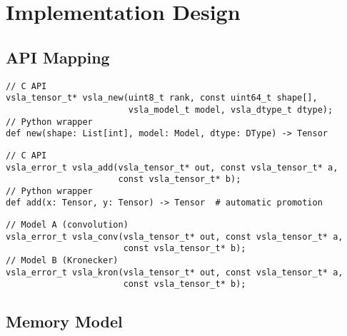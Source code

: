\section{Implementation Design}
\label{sec:implementation}

\subsection{API Mapping}
\label{sec:api}

\begin{tcolorbox}[colback=api,colframe=green!50!black,title=C Library API Mapping]
\begin{description}[leftmargin=2em]
\item[Tensor Creation:] 
\begin{verbatim}
// C API
vsla_tensor_t* vsla_new(uint8_t rank, const uint64_t shape[], 
                        vsla_model_t model, vsla_dtype_t dtype);
// Python wrapper  
def new(shape: List[int], model: Model, dtype: DType) -> Tensor
\end{verbatim}

\item[Variable-Shape Operations:]
\begin{verbatim}
// C API  
vsla_error_t vsla_add(vsla_tensor_t* out, const vsla_tensor_t* a, 
                      const vsla_tensor_t* b);
// Python wrapper
def add(x: Tensor, y: Tensor) -> Tensor  # automatic promotion
\end{verbatim}

\item[Semiring Products:]
\begin{verbatim}
// Model A (convolution)
vsla_error_t vsla_conv(vsla_tensor_t* out, const vsla_tensor_t* a, 
                       const vsla_tensor_t* b);
// Model B (Kronecker)  
vsla_error_t vsla_kron(vsla_tensor_t* out, const vsla_tensor_t* a,
                       const vsla_tensor_t* b);
\end{verbatim}
\end{description}
\end{tcolorbox}

\subsection{Memory Model}
\label{sec:memory}

